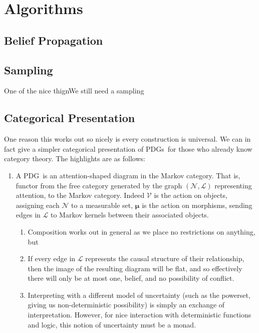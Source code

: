 \documentclass{article}
\newcommand{\MN}{PDG}%
\newcommand{\MNs}{PDGs}
\newcommand\bmu{\boldsymbol{\mu}}
\begin{document}
	\section{Algorithms}\label{sec:algorithms}
	\subsection{Belief Propagation}
	\subsection{Sampling}
	
	One of the nice thignWe still need a sampling 



	\begin{vcat}
		\section{Categorical Presentation}
		One reason this works out so nicely is every construction is universal. We can in fact give a simpler categorical presentation of \MNs\ for those who already know category theory. The highlights are as follows:
		\begin{enumerate}
			\item A \MN\ is an attention-shaped diagram in the Markov category. That is, functor from the free category generated by the graph $(\mathcal N, \mathcal L)$ representing attention, to the Markov category. Indeed $\mathcal V$ is the action on objects, assigning each $\mathcal N$ to a measurable set, $\bmu$ is the action on morphisms, sending edges in $\mathcal L$ to Markov kernels between their associated objects. 
			\begin{enumerate}
				\item Composition works out in general as we place no restrictions on anything, but
				\item If every edge in $\mathcal L$ represents the causal structure of their relationship, then the image of the resulting diagram will be flat, and so effectively there will only be at most one, belief, and no possibility of conflict.
				\item Interpreting with a different model of uncertainty (such as the powerset, giving us non-deterministic possibility) is simply an exchange of interpretation. However, for nice interaction with deterministic functions and logic, this notion of uncertainty must be a monad.
			\end{enumerate}
			

\end{enumerate}
\end{vcat}
\end{document}
